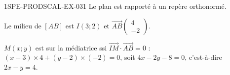 \begin{corrige}{1SPE-PRODSCAL-EX-031}
Le plan est rapporté à un repère orthonormé.

Le milieu de $[AB]$ est $I(3; 2)$ et $\overrightarrow{AB}\begin{pmatrix} 4 \\ -2 \end{pmatrix}$.

$M(x; y)$ est sur la médiatrice ssi $\overrightarrow{IM} \cdot \overrightarrow{AB} = 0$ :
$(x - 3) \times 4 + (y - 2) \times (-2) = 0$, soit $4x - 2y - 8 = 0$, c'est-à-dire $2x - y = 4$.
\end{corrige}
